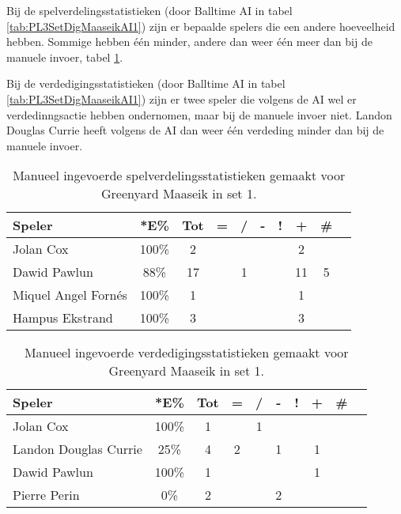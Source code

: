 Bij de spelverdelingsstatistieken (door Balltime AI in tabel \ref{tab:PL3SetDigMaaseikAI1}) zijn er bepaalde spelers die een andere hoeveelheid hebben. Sommige hebben één minder, andere dan weer één meer dan bij de manuele invoer, tabel \ref{tab:PL3SetMaaseikMan1}.

Bij de verdedigingsstatistieken (door Balltime AI in tabel \ref{tab:PL3SetDigMaaseikAI1}) zijn er twee speler die volgens de AI wel er verdedinngsactie hebben ondernomen, maar bij de manuele invoer niet. Landon Douglas Currie heeft volgens de AI dan weer één verdeding minder dan bij de manuele invoer.

\begin{table}[ht!]
    \centering
    \scriptsize
    \begin{tabular}{|l|c|c|c|c|c|c|c|c|c|} \hline
        \textbf{Speler} & *E\% & Tot & = & / & - & ! & + & \# \\ \hline
        Jolan Cox & 100\% & 2 &  &  &  &  & 2 &  \\ 
        Dawid Pawlun & 88\% & 17 &  & 1 &  &  & 11 & 5 \\ 
        Miquel Angel Fornés & 100\% & 1 &  &  &  &  & 1 &  \\ 
        Hampus Ekstrand & 100\% & 3 &  &  &  &  & 3 &  \\ \hline
    \end{tabular}
    \caption[Manueel ingevoerde spelverdelingsstatistieken gemaakt voor Greenyard Maaseik in set 1]{\label{tab:PL3SetMaaseikMan1}Manueel ingevoerde spelverdelingsstatistieken gemaakt voor Greenyard Maaseik in set 1.}
\end{table}

\begin{table}[ht!]
    \centering
    \scriptsize
    \begin{tabular}{|l|c|c|c|c|c|c|c|c|c|} \hline
        \textbf{Speler} & *E\% & Tot & = & / & - & ! & + & \# \\ \hline
        Jolan Cox & 100\% & 1 &  & 1 &  &  &  & \\
        Landon Douglas Currie & 25\% & 4 & 2 &  & 1 &  & 1 & \\ 
        Dawid Pawlun & 100\% & 1 &  &  &  &  & 1 & \\
        Pierre Perin & 0\% & 2 &  &  & 2 &  &  &  \\ \hline
    \end{tabular}
    \caption[Manueel ingevoerde verdedigingsstatistieken gemaakt voor Greenyard Maaseik in set 1]{\label{tab:PL3DigMaaseikMan1}Manueel ingevoerde verdedigingsstatistieken gemaakt voor Greenyard Maaseik in set 1.}
\end{table}


